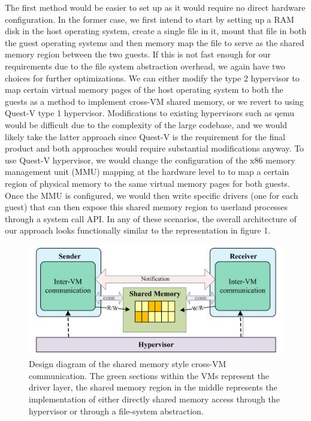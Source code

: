 \documentclass[12pt]{article}
\begin{document}
The first method would be easier to set up as it would require no direct hardware configuration. In the former case, we first intend to start by setting up a RAM disk in the host operating system, create a single file in it, mount that file in both the guest operating systems and then memory map the file to serve as the shared memory region between the two guests. If this is not fast enough for our requirements due to the file system abstraction overhead, we again have two choices for further optimizations. We can either modify the type 2 hypervisor to map certain virtual memory pages of the host operating system to both the guests as a method to implement cross-VM shared memory, or we revert to using Quest-V type 1 hypervisor. Modifications to existing hypervisors such as qemu would be difficult due to the complexity of the large codebase, and we would likely take the latter approach since Quest-V is the requirement for the final product and both approaches would require substantial modifications anyway. To use Quest-V hypervisor, we would change the configuration of the x86 memory management unit (MMU) mapping at the hardware level to to map a certain region of physical memory to the same virtual memory pages for both guests. Once the MMU is configured, we would then write specific drivers (one for each guest) that can then expose this shared memory region to userland processes through a system call API. In any of these scenarios, the overall architecture of our approach looks functionally similar to the representation in figure 1.

\begin{figure}[H]
	\includegraphics[width=\linewidth]{./../img/design-diagram-noinv.png}
	\caption{Design diagram of the shared memory style cross-VM communication. The green sections within the VMs represent the driver layer, the shared memory region in the middle represents the implementation of either directly shared memory access through the hypervisor or through a file-system abstraction.\protect\footnotemark}
	\label{design-diagram}
\end{figure}
\end{document}
